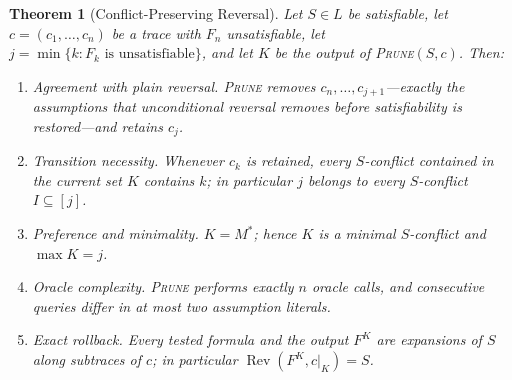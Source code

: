 \documentclass[11pt,reqno]{amsart}
\theoremstyle{plain}
\newtheorem{theorem}{Theorem}
\theoremstyle{definition}
\DeclareMathOperator{\Rev}{Rev}
\newcommand{\Mstar}{M^{*}}
\newcommand{\PRUNE}{\textsc{Prune}}
\begin{document}
\begin{theorem}[Conflict-Preserving Reversal]
Let $S\in L$ be satisfiable, let $c=(c_1,\dots,c_n)$ be a trace with $F_n$
unsatisfiable, let $j=\min\{k:F_k\text{ is unsatisfiable}\}$, and let $K$ be the
output of \PRUNE$(S,c)$. Then:
\begin{enumerate}
\item[\textup{(i)}] \emph{Agreement with plain reversal.} \PRUNE{} removes
$c_n,\dots,c_{j+1}$---exactly the assumptions that unconditional reversal removes
before satisfiability is restored---and retains $c_j$.
\item[\textup{(ii)}] \emph{Transition necessity.} Whenever $c_k$ is retained, every
$S$-conflict contained in the current set $K$ contains $k$; in particular $j$
belongs to every $S$-conflict $I\subseteq[j]$.
\item[\textup{(iii)}] \emph{Preference and minimality.} $K=\Mstar$; hence $K$ is a
minimal $S$-conflict and $\max K=j$.
\item[\textup{(iv)}] \emph{Oracle complexity.} \PRUNE{} performs exactly $n$ oracle
calls, and consecutive queries differ in at most two assumption literals.
\item[\textup{(v)}] \emph{Exact rollback.} Every tested formula and the output
$F^K$ are expansions of $S$ along subtraces of $c$; in particular
$\Rev(F^K,c|_K)=S$.
\end{enumerate}
\end{theorem}
\end{document}
